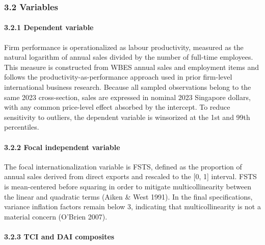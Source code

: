\documentclass[
  12pt,a4paper]{article}
\begin{document}
\hypertarget{variables}{%
\subsubsection{3.2 Variables}\label{variables}}

\hypertarget{dependent-variable}{%
\paragraph{3.2.1 Dependent variable}\label{dependent-variable}}

Firm performance is operationalized as labour productivity, measured as
the natural logarithm of annual sales divided by the number of full-time
employees. This measure is constructed from WBES annual sales and
employment items and follows the productivity-as-performance approach
used in prior firm-level international business research. Because all
sampled observations belong to the same 2023 cross-section, sales are
expressed in nominal 2023 Singapore dollars, with any common price-level
effect absorbed by the intercept. To reduce sensitivity to outliers, the
dependent variable is winsorized at the 1st and 99th percentiles.

\hypertarget{focal-independent-variable}{%
\paragraph{3.2.2 Focal independent
variable}\label{focal-independent-variable}}

The focal internationalization variable is FSTS, defined as the
proportion of annual sales derived from direct exports and rescaled to
the {[}0, 1{]} interval. FSTS is mean-centered before squaring in order
to mitigate multicollinearity between the linear and quadratic terms
(Aiken \& West 1991). In the final specifications, variance inflation
factors remain below 3, indicating that multicollinearity is not a
material concern (O'Brien 2007).

\hypertarget{tci-and-dai-composites}{%
\paragraph{3.2.3 TCI and DAI composites}\label{tci-and-dai-composites}}
\end{document}

